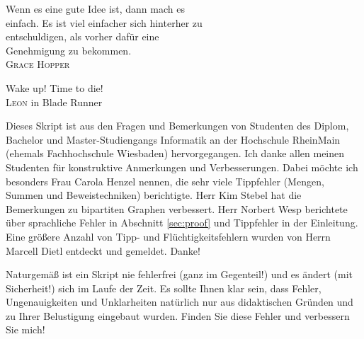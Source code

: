 \documentclass[11pt, a4paper, twoside, bibliography=totoc]{scrartcl}
\begin{document}
\vspace*{1.5cm}

\begin{raggedleft}
Wenn es eine gute Idee ist, dann mach es\\ 
einfach. Es ist viel einfacher sich hinterher zu\\
entschuldigen, als vorher dafür eine\\
Genehmigung zu bekommen.\\[\smallskipamount]
\hfill \textsc{Grace Hopper}%
\end{raggedleft}

\vspace*{1.5cm}

\begin{raggedleft}
Wake up! Time to die!\\[\smallskipamount]
\hfill \textsc{Leon} in Blade Runner%
\end{raggedleft}

\vfill

Dieses Skript ist aus den Fragen und Bemerkungen von Studenten des
Diplom, Bachelor und Master-Studiengangs Informatik an der Hochschule
RheinMain (ehemals Fachhochschule Wiesbaden) hervorgegangen. Ich danke
allen meinen Studenten für konstruktive Anmerkungen und
Verbesserungen. Dabei möchte ich besonders Frau Carola Henzel nennen,
die sehr viele Tippfehler (Mengen, Summen und Beweistechniken)
berichtigte. Herr Kim Stebel hat die Bemerkungen zu bipartiten Graphen
verbessert. Herr Norbert Wesp berichtete über sprachliche Fehler in
Abschnitt \ref{sec:proof} und Tippfehler in der Einleitung. Eine größere 
Anzahl von Tipp- und Flüchtigkeitsfehlern wurden von Herrn Marcell Dietl
entdeckt und gemeldet. Danke!

Naturgemäß ist ein Skript nie fehlerfrei (ganz im Gegenteil!) und es
ändert (mit Sicherheit!) sich im Laufe der Zeit. Es sollte Ihnen klar 
sein, dass Fehler, Ungenauigkeiten und Unklarheiten natürlich nur 
aus didaktischen Gründen und zu Ihrer  Belustigung eingebaut 
wurden. Finden Sie diese Fehler und verbessern Sie mich!

\cleardoublepage

\tableofcontents

\cleardoublepage

\pagestyle{scrheadings}

	
\end{document}
